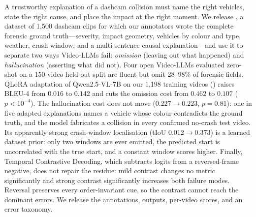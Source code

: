 A trustworthy explanation of a dashcam collision must name the right vehicles, state the right cause, and place the impact at the right moment.
We release \dataset{}, a dataset of 1{,}500 dashcam clips for which our annotators wrote the complete forensic ground truth---severity, impact geometry, vehicles by colour and type, weather, crash window, and a multi-sentence causal explanation---and use it to separate two ways Video-LLMs fail: \emph{omission} (leaving out what happened) and \emph{hallucination} (asserting what did not).
Four open Video-LLMs evaluated zero-shot on a 150-video held-out split are fluent but omit 28--98\% of forensic fields.
QLoRA adaptation of Qwen2.5-VL-7B on our 1{,}198 training videos (\crashlogic) raises BLEU-4 from $0.016$ to $0.142$ and cuts the omission cost from $0.462$ to $0.107$ ($p<10^{-4}$).
The hallucination cost does not move ($0.227\to0.223$, $p=0.81$): one in five adapted explanations names a vehicle whose colour contradicts the ground truth, and the model fabricates a collision in every confirmed no-crash test video.
Its apparently strong crash-window localisation (tIoU $0.012\to0.373$) is a learned dataset prior: only two windows are ever emitted, the predicted start is uncorrelated with the true start, and a constant window scores higher.
Finally, Temporal Contrastive Decoding, which subtracts logits from a reversed-frame negative, does not repair the residue: mild contrast changes no metric significantly and strong contrast significantly increases both failure modes.
Reversal preserves every order-invariant cue, so the contrast cannot reach the dominant errors.
We release the annotations, outputs, per-video scores, and an error taxonomy.
